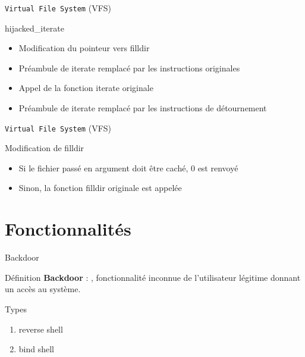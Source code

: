 \documentclass[10pt]{beamer}
\begin{document}
	\begin{frame}{\texttt{Virtual File System} (VFS)}
		\begin{alertblock}{hijacked\_iterate}
	    \end{alertblock}	 
		\vspace{-0.60cm}
		\begin{itemize}
			\item Modification du pointeur vers \alert{filldir}
			\item Préambule de \alert{iterate} remplacé par les instructions originales
			\item Appel de la fonction \alert{iterate} originale
			\item Préambule de \alert{iterate} remplacé par les instructions de détournement
		\end{itemize}
	\end{frame}

	\begin{frame}{\texttt{Virtual File System} (VFS)}
		\begin{alertblock}{Modification de filldir}
	    \end{alertblock}	 
		\vspace{-0.60cm}
		\begin{itemize}
			\item Si le fichier passé en argument doit être caché, 0 est renvoyé
			\item Sinon, la fonction \alert{filldir} originale est appelée
		\end{itemize}
	\end{frame}

\section{Fonctionnalités}

\begin{frame}{Backdoor}
	
	\begin{alertblock}{Définition}
		\textbf{Backdoor} : , fonctionnalité inconnue de l'utilisateur légitime donnant un accès au système.
    \end{alertblock}
    
	\begin{alertblock}{Types}
		\begin{enumerate}
			\item reverse shell
			\item bind shell
		\end{enumerate}
    \end{alertblock}

\end{frame}
\end{document}
